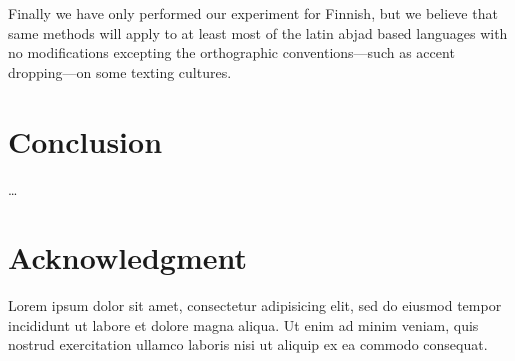 \documentclass[a4paper,conference]{IEEEtran}
\begin{document}
Finally we have only performed our experiment for Finnish, but we believe that
same methods will apply to at least most of the latin abjad based languages
with no modifications excepting the orthographic conventions---such as accent
dropping---on some texting cultures.

\section{Conclusion}
\label{sec:conclusions}

\ldots \balance
\section*{Acknowledgment}
Lorem ipsum dolor sit amet, consectetur adipisicing elit, sed do eiusmod tempor incididunt ut labore et dolore magna aliqua. Ut enim ad minim veniam, quis nostrud exercitation ullamco laboris nisi ut aliquip ex ea commodo consequat.

\






\end{document}
